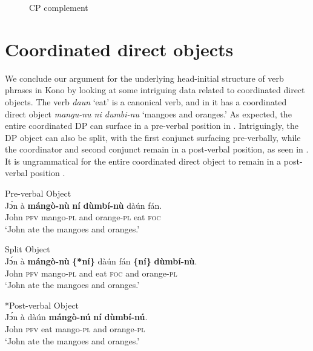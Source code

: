 \documentclass[output=paper,colorlinks,citecolor=brown,draftmode
]{langscibook}
\begin{document}
 \begin{figure}
 \caption{CP complement}
   \label{CP Complement}
\end{figure}


\section{Coordinated direct objects}
\label{sec:Coordinated Direct Objects}
We conclude our argument for the underlying head-initial structure of verb phrases in Kono by looking at some intriguing data related to coordinated direct objects. The verb \textit{daun} ‘eat’ is a canonical verb, and in  it has a coordinated direct object \textit{mangu-nu ni dumbi-nu} ‘mangoes and oranges.’ As expected, the entire coordinated DP can surface in a pre-verbal position in . Intriguingly, the DP object can also be split, with the first conjunct surfacing pre-verbally, while the coordinator and second conjunct remain in a post-verbal position, as seen in . It is ungrammatical for the entire coordinated direct object to remain in a post-verbal position . 


\ea \label{ex:Kono: Coord DO}
\begin{xlist}

\ex \label{ex:Kono:PreVCoord}
Pre-verbal Object \\
\gll Jɔ́n à \textbf{mángò-nù} \textbf{ní} \textbf{dùmbí-nù} dàún fán. \\
John \textsc{pfv} mango-\textsc{pl} and orange-\textsc{pl} eat \textsc{foc} \\
\glt `John ate the mangoes and oranges.'

\ex \label{ex:Kono:SplitCoord}
Split Object \\
\gll Jɔ́n à \textbf{mángò-nù} \textbf{\{*ní\}} dàún fán \textbf{\{ní\}} \textbf{dùmbí-nù}. \\
John \textsc{pfv} mango-\textsc{pl} and eat \textsc{foc} and orange-\textsc{pl} \\
\glt `John ate the mangoes and oranges.'

\ex \label{ex:Kono:PostCoord}
*Post-verbal Object \\
\gll *Jɔ́n à dàún \textbf{mángò-nú} \textbf{ní} \textbf{dùmbí-nú}. \\
John \textsc{pfv} eat mango-\textsc{pl} and orange-\textsc{pl}  \\
\glt `John ate the mangoes and oranges.'

\end{xlist}
\z 
\end{document}
